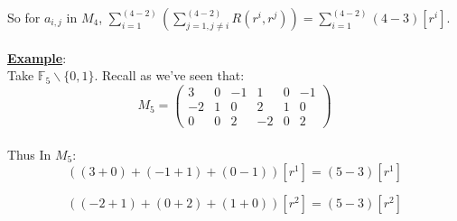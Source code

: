 \documentclass[11pt]{article}
\theoremstyle{plain}
\theoremstyle{definition}
\begin{document}
So for $a_{i,j}$ in $M_4$, $\sum\limits_{i=1}^{(4-2)}( \sum\limits_{j=1, j \neq i}^{(4-2)} R(r^i,r^j) ) = \sum\limits_{i=1}^{(4-2)} (4-3)[r^i]$.\\
\\
\textbf{\underline{Example}}:\\ Take $\mathbb{F}_{5}  \backslash \{0,1\}$. Recall as we've seen that:
\\
\[ M_5 = \left( \begin{array}{cccccc}
3  & 0  & -1 &  1 &   0 &  -1\\
-2 &   1 &  0 & 2  & 1 & 0  \\
0  & 0  & 2 &  -2  & 0 & 2   \end{array} \right)\]
\\Thus In $M_5$:
	\begin{equation*}
((3+0) + (-1 + 1) + (0 -1))[r^1] = (5-3)[r^1]
\end{equation*}

\begin{equation*}
((-2+1) + (0 + 2) + (1+0))[r^2] = (5-3)[r^2]
\end{equation*}
\end{document}
